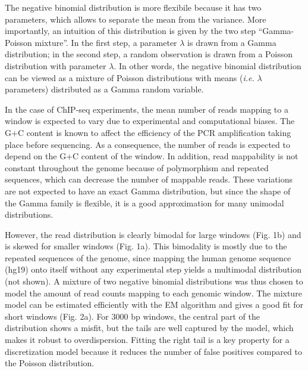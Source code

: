 \documentclass[12pt]{article}
\begin{document}
The negative binomial distribution is more flexibile because it has two parameters, which allows to separate the mean from the variance. More importantly, an intuition of this distribution is given by the two step ``Gamma-Poisson mixture''. In the first step, a parameter $\lambda$ is drawn from a Gamma distribution; in the second step, a random observation is drawn from a Poisson distribution with parameter $\lambda$. In other words, the negative binomial distribution can be viewed as a mixture of Poisson distributions with means (\textit{i.e.} $\lambda$ parameters) distributed as a Gamma random variable.

In the case of ChIP-seq experiments, the mean number of reads mapping to a window is expected to vary due to experimental and computational biases. The G+C content is known to affect the efficiency of the PCR amplification taking place before sequencing. As a consequence, the number of reads is expected to depend on the G+C content of the window. In addition, read mappability is not constant throughout the genome because of polymorphism and repeated sequences, which can decrease the number of mappable reads. These variations are not expected to have an exact Gamma distribution, but since the shape of the Gamma family is flexible, it is a good approximation for many unimodal distributions.

However, the read distribution is clearly bimodal for large windows (Fig. 1b) and is skewed for smaller windows (Fig. 1a). This bimodality is mostly due to the repeated sequences of the genome, since mapping the human genome sequence (hg19) onto itself without any experimental step yields a multimodal distribution (not shown). A mixture of two negative binomial distributions was thus chosen to model the amount of read counts mapping to each genomic window. The mixture model can be estimated efficiently with the EM algorithm \cite{Dempster77maximumlikelihood} and gives a good fit for short windows (Fig. 2a). For 3000 bp windows, the central part of the distribution shows a misfit, but the tails are well captured by the model, which makes it robust to overdispersion. Fitting the right tail is a key property for a discretization model because it reduces the number of false positives compared to the Poisson distribution.
\end{document}
